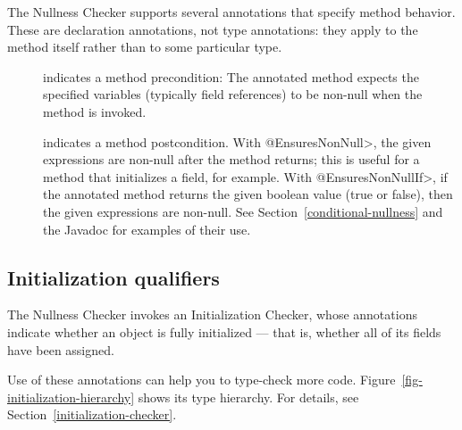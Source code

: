 The Nullness Checker supports several annotations that specify method
behavior.  These are declaration annotations, not type annotations:  they
apply to the method itself rather than to some particular type.

\begin{description}

\item[]
  indicates a method precondition:  The annotated method expects the
  specified variables (typically field references) to be non-null when the
  method is invoked.

\item[]
\item[]
  indicates a method postcondition.  With \<@EnsuresNonNull>, the given
  expressions are non-null after the method returns; this is useful for a
  method that initializes a field, for example.  With
  \<@EnsuresNonNullIf>, if the annotated
  method returns the given boolean value (true or false), then the given
  expressions are non-null.  See Section~\ref{conditional-nullness} and the
  Javadoc for examples of their use.

\end{description}


\subsection{Initialization qualifiers\label{initialization-qualifiers-overview}}

The Nullness Checker invokes an Initialization Checker, whose annotations indicate whether
an object is fully initialized --- that is, whether all of its fields have
been assigned.

\begin{description}
\item[]
\item[]
\item[]
\end{description}

\noindent
Use of these annotations can help you to type-check more
code.  Figure~\ref{fig-initialization-hierarchy} shows its type hierarchy.  For
details, see Section~\ref{initialization-checker}.

